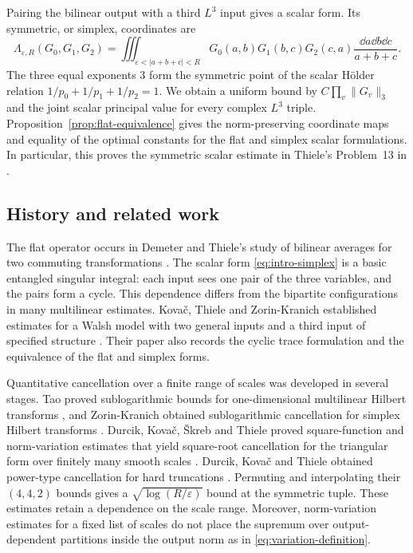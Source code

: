 Pairing the bilinear output with a third $L^3$ input gives a scalar
form. Its symmetric, or simplex, coordinates are
\begin{equation}\label{eq:intro-simplex}
 \Lambda_{\varepsilon,R}(G_0,G_1,G_2)
 =\iiint_{\varepsilon<|a+b+c|<R}
  G_0(a,b)G_1(b,c)G_2(c,a)
             \frac{\dd a\dd b\dd c}{a+b+c}.
\end{equation}
The three equal exponents $3$ form the symmetric point of the scalar
H\"older relation $1/p_0+1/p_1+1/p_2=1$.
We obtain a uniform bound by $C\prod_v\|G_v\|_3$ and the joint scalar
principal value for every complex $L^3$ triple.
Proposition~\ref{prop:flat-equivalence} gives the norm-preserving
coordinate maps and equality of the optimal constants for the flat
and simplex scalar formulations. In particular, this proves the
symmetric scalar estimate in Thiele's Problem~13 in
\cite[Section~9]{GrafakosEtAl2017}.

\subsection{History and related work}

The flat operator occurs in Demeter and Thiele's study of bilinear
averages for two commuting transformations
\cite[Section~6]{DemeterThiele2010}. The scalar form
\eqref{eq:intro-simplex} is a basic entangled singular integral: each
input sees one pair of the three variables, and the pairs form a cycle.
This dependence differs from the bipartite configurations in many
multilinear estimates. Kova\v{c}, Thiele and Zorin-Kranich established
estimates for a Walsh model with two general inputs and a third input
of specified structure \cite[Theorem~1.7]{KovacThieleZorinKranich2015}.
Their paper also records the cyclic trace formulation and the
equivalence of the flat and simplex forms.

Quantitative cancellation over a finite range of scales was developed
in several stages. Tao proved sublogarithmic bounds for one-dimensional
multilinear Hilbert transforms \cite{Tao2016Cancellation}, and
Zorin-Kranich obtained sublogarithmic cancellation for simplex Hilbert
transforms \cite{ZorinKranich2017}. Durcik, Kova\v{c}, \v{S}kreb and
Thiele proved square-function and norm-variation estimates that yield
square-root cancellation for the triangular form over finitely many
smooth scales \cite[Corollary~5]{DurcikKovacSkrebThiele2019}.
Durcik, Kova\v{c} and Thiele obtained power-type cancellation for hard
truncations \cite[Theorem~1]{DurcikKovacThiele2019}. Permuting and
interpolating their $(4,4,2)$ bounds gives a
$\sqrt{\log(R/\varepsilon)}$ bound at the symmetric tuple.
These estimates retain a dependence on the scale range. Moreover,
norm-variation estimates for a fixed list of scales do not place the
supremum over output-dependent partitions inside the output norm as
in \eqref{eq:variation-definition}.

